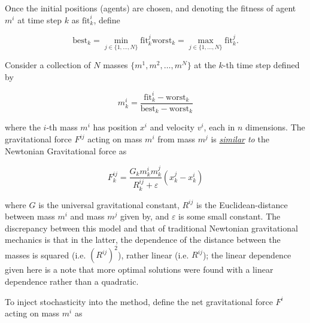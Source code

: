 \documentclass{article}
\begin{document}
            Once the initial positions (agents) are chosen, and denoting the fitness of agent $m^i$ at time step $k$ as $\mathrm{fit}_k^i$, define

            \begin{subequations}
                \begin{equation}
                    \mathrm{best}_k = \min_{j \in \{1, \ldots, N\}} \mathrm{fit}_k^j
                \end{equation}
                \begin{equation}
                    \mathrm{worst}_k = \max_{j \in \{1, \ldots, N\}} \mathrm{fit}_k^j.
                \end{equation}
            \end{subequations}

            Consider a collection of $N$ masses $\{m^1, m^2, \ldots, m^N\}$ at the $k$-th time step defined by 
            
            \begin{equation}
                m_k^i = \frac{\mathrm{fit}_k^i - \mathrm{worst}_k}{\mathrm{best}_k- \mathrm{worst}_k}
            \end{equation}
            
            where the $i$-th mass $m^i$ has position $x^i$ and velocity $v^i$, each in $n$ dimensions.  The gravitational force $F^{ij}$ acting on mass $m^i$ from mass $m^j$ is \emph{\underline{similar} to} the Newtonian Gravitational force as 

            \begin{equation}
                F_k^{ij} = \frac{G_k m_k^i m_k^j}{R_k^{ij} + \varepsilon} \left(x_k^j - x_k^i \right)
            \end{equation}

            where $G$ is the universal gravitational constant, $R^{ij}$ is the Euclidean-distance between mass $m^i$ and mass $m^j$ given by, and $\varepsilon$ is some small constant.  The discrepancy between this model and that of traditional Newtonian gravitational mechanics is that in the latter, the dependence of the distance between the masses is squared (i.e. $\left(R^{ij}\right)^2$), rather linear (i.e. $R^{ij}$); the linear dependence given here is a note that more optimal solutions were found\cite{GSA} with a linear dependence rather than a quadratic.

            To inject stochasticity into the method, define the net gravitational force $F^i$ acting on mass $m^i$ as 
\end{document}
